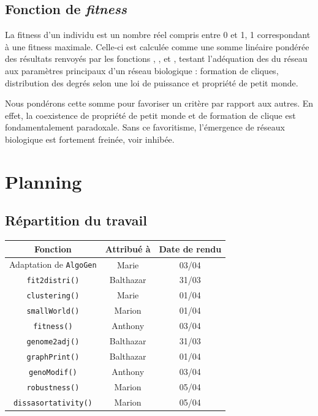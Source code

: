 \subsection{Fonction de \textit{fitness} }
\label{fitness}
La fitness d'un individu est un nombre réel compris entre 0 et 1, 1 correspondant à une fitness maximale.
Celle-ci est calculée comme une somme linéaire pondérée des résultats renvoyés par les fonctions \texttt{}, \texttt{}, et \texttt{}, testant l'adéquation des du réseau aux paramètres principaux d'un réseau biologique : formation de cliques, distribution des degrés selon une loi de puissance et propriété de petit monde.

\medskip
Nous pondérons cette somme pour favoriser un critère par rapport aux autres. En effet, la coexistence de propriété de petit monde et de formation de clique est fondamentalement paradoxale. Sans ce favoritisme, l'émergence de réseaux biologique est fortement freinée, voir inhibée.


\section{Planning}

\subsection{Répartition du travail}

\begin{center}
\begin{table}[!h]
\begin{tabular}{|c|c|c|}
\hline Fonction & Attribué à & Date de rendu \\
\hline
Adaptation de \verb?AlgoGen? & Marie & 03/04 \\
\hline
\verb?fit2distri()? & Balthazar & 31/03 \\
\hline
\verb?clustering()? & Marie & 01/04\\
\hline 
\verb?smallWorld()? & Marion & 01/04\\
\hline
\verb?fitness()? & Anthony & 03/04\\
\hline 
\verb?genome2adj()? & Balthazar & 31/03 \\
\hline 
\verb?graphPrint()? & Balthazar & 01/04 \\
\hline 
\verb?genoModif()? & Anthony & 03/04 \\
\hline 
\verb?robustness()? & Marion & 05/04 \\
\hline 
\verb?dissasortativity()? & Marion & 05/04\\
\hline 
\end{tabular}
\end{table}
\end{center}


